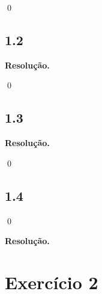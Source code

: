 \documentclass[12pt,letterpaper]{article}
\newcommand\answer{\textbf{Resolução.}\xspace}
\begin{document}
\qed %


\subsection*{1.2}
\answer

\qed

\subsection*{1.3}
\answer

\qed

\subsection*{1.4}

\qed

\answer

\section*{Exercício 2}
\end{document}
